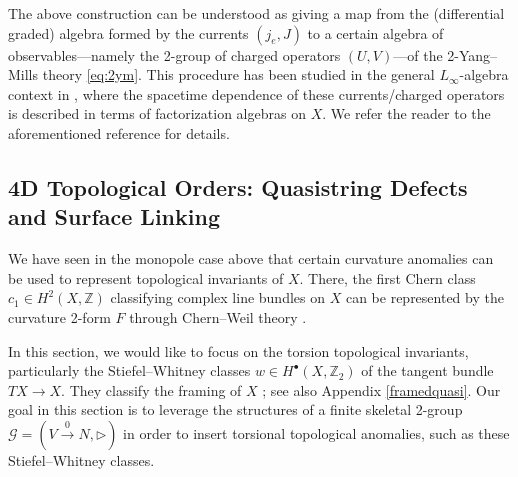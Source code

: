 \documentclass[onecolumn]{article}
\theoremstyle{theorem}
\theoremstyle{remark}
\theoremstyle{example}
\theoremstyle{definition}
\numberwithin{equation}{section}
\def\bbZ{\mathbb{Z}}
\begin{document}

    The above construction can be understood as giving a map from the (differential graded) algebra formed by the currents $(j_e,J)$ to a certain algebra of observables---namely the 2-group of charged operators $(U,V)$---of the 2-Yang--Mills theory \eqref{eq:2ym}. This procedure has been studied in the general $L_\infty$-algebra context in \cite{costello_gwilliam_2016}, where the spacetime dependence of these currents/charged operators is described in terms of { {factorization algebras}} on $X$. We refer the reader to the aforementioned reference for details.
    


\subsection{4D Topological Orders: Quasistring Defects and Surface Linking} \label{strpt}
We have seen in the monopole case above that certain curvature anomalies can be used to represent topological invariants of $X$. There, the first Chern class $c_1\in H^2(X,\bbZ)$ classifying complex line bundles on $X$ can be represented by the curvature 2-form $F$ through Chern--Weil theory \cite{book-algtop,book-charclass}. 

In this section, we would like to focus on the {{torsion}} topological invariants, particularly the Stiefel--Whitney classes $w\in H^\bullet(X,\bbZ_2)$ of the tangent bundle $TX \rightarrow X$. They  classify the { {framing}} of $X$ \cite{book-algtop,book-charclass}; see also {Appendix} %
 \ref{framedquasi}. Our goal in this section is to leverage the structures of a {{finite}} skeletal 2-group $\mathcal{G}=(V\xrightarrow{0} N,\rhd)$ in order to insert torsional topological anomalies, such as these Stiefel--Whitney classes. 
\end{document}
